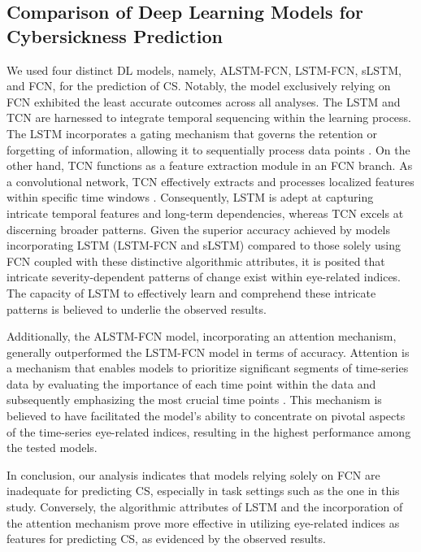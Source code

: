 \documentclass{ieeeaccess}
\begin{document}
\subsection{Comparison of Deep Learning Models for Cybersickness Prediction}

We used four distinct DL models, namely, ALSTM-FCN, LSTM-FCN, sLSTM, and FCN, for the prediction of CS. Notably, the model exclusively relying on FCN exhibited the least accurate outcomes across all analyses. The LSTM and TCN are harnessed to integrate temporal sequencing within the learning process. The LSTM incorporates a gating mechanism that governs the retention or forgetting of information, allowing it to sequentially process data points \cite{Hochreiter_1997}.
On the other hand, TCN functions as a feature extraction module in an FCN branch. As a convolutional network, TCN effectively extracts and processes localized features within specific time windows \cite{Lea_2016}. Consequently, LSTM is adept at capturing intricate temporal features and long-term dependencies, whereas TCN excels at discerning broader patterns. 
Given the superior accuracy achieved by models incorporating LSTM (LSTM-FCN and sLSTM) compared to those solely using FCN coupled with these distinctive algorithmic attributes, it is posited that intricate severity-dependent patterns of change exist within eye-related indices. The capacity of LSTM to effectively learn and comprehend these intricate patterns is believed to underlie the observed results.

Additionally, the ALSTM-FCN model, incorporating an attention mechanism, generally outperformed the LSTM-FCN model in terms of accuracy. 
Attention is a mechanism that enables models to prioritize significant segments of time-series data by evaluating the importance of each time point within the data and subsequently emphasizing the most crucial time points \cite{Bahdanau_2014}. This mechanism is believed to have facilitated the model’s ability to concentrate on pivotal aspects of the time-series eye-related indices, resulting in the highest performance among the tested models.

In conclusion, our analysis indicates that models relying solely on FCN are inadequate for predicting CS, especially in task settings such as the one in this study. Conversely, the algorithmic attributes of LSTM and the incorporation of the  attention mechanism prove more effective in utilizing eye-related indices as features for predicting CS, as evidenced by the observed results.
\end{document}
